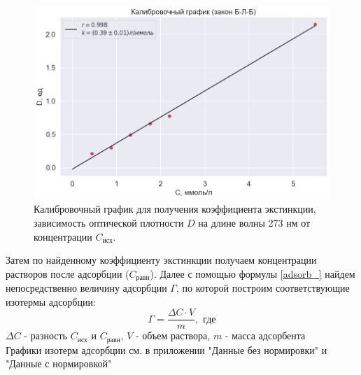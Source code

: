 \documentclass[a4paper,12pt]{article} %
\begin{document}
\begin{figure}[H]
    \includegraphics[width=18cm]{kalibr.png}
    \caption{Калибровочный график для получения коэффициента экстинкции, зависимость оптической плотности $D$ на длине волны 273 нм от концентрации $C_{\text{исх}}$.}
    \label{kalibr}
\end{figure}

 Затем по найденному коэффициенту экстинкции получаем концентрации растворов после адсорбции ($C_{\text{равн}}$). Далее с помощью формулы \eqref{adsorb_} найдем непосредственно величину адсорбции $\Gamma$, по которой построим соответствующие изотермы адсорбции:
\begin{equation}
    \Gamma = \dfrac{\Delta C \cdot V}{m}, \textrm{ где}
    \label{adsorb_}
\end{equation}
$\Delta C$ - разность $C_{\text{исх}}$ и $C_{\text{равн}}$, \newline $V$ - объем раствора, 
\newline $m$ - масса адсорбента
\\ Графики изотерм адсорбции см. в приложении "Данные без нормировки" и "Данные с нормировкой"
\end{document}
